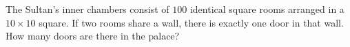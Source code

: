 The Sultan's inner chambers consist of $100$ identical square rooms arranged in a $10\times10$ square. If two rooms share a wall, there is exactly one door in that wall. How many doors are there in the palace?
